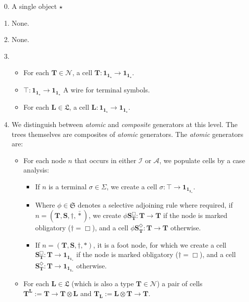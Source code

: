 \begin{myboxB}
\begin{multicols}{2}
\begin{construction}
\begin{enumerate}
\setcounter{enumi}{-1}
\item{A single object $\star$}
\item{None.}
\item{None.}
\item{
	\begin{itemize}
	\item{For each $\mathbf{T} \in \mathcal{N}$, a cell $\mathbf{T}: \mathbf{1}_{\mathbf{1}_\star} \rightarrow \mathbf{1}_{\mathbf{1}_\star}$.}
	\item{$\top: \mathbf{1}_{\mathbf{1}_\star} \rightarrow \mathbf{1}_{\mathbf{1}_\star}$ A wire for terminal symbols.}
	\item{For each $\mathbf{L} \in \mathfrak{L}$, a cell $\mathbf{L} : \mathbf{1}_{\mathbf{1}_\star} \rightarrow \mathbf{1}_{\mathbf{1}_\star}$.}
	\end{itemize}
}
\item{
	We distinguish between \emph{atomic} and \emph{composite} generators at this level. The trees themselves are composites of \emph{atomic} generators. The \emph{atomic} generators are:
	\begin{itemize}
	\item{For each node $n$ that occurs in either $\mathcal{I}$ or $\mathcal{A}$, we populate cells by a case analysis:
	\begin{itemize}
		\item{If $n$ is a terminal $\sigma \in \Sigma$, we create a cell $\sigma: \top \rightarrow \mathbf{1}_{\mathbf{1}_{\mathbf{1}_\star}}$.}
		\item{Where $\phi \in \mathfrak{S}$ denotes a selective adjoining rule where required, if $n = (\mathbf{T},\mathbf{S},\dagger,\bar{*})$, we create $\phi\mathbf{S}_\mathbf{T}^\Box: \mathbf{T} \rightarrow \mathbf{T}$ if the node is marked obligatory ($\dagger = \Box$), and a cell $\phi\mathbf{S}_\mathbf{T}^\Diamond: \mathbf{T} \rightarrow \mathbf{T}$ otherwise.}
		\item{If $n = (\mathbf{T},\mathbf{S},\dagger,*)$, it is a foot node, for which we create a cell $\mathbf{S}_\mathbf{T}^\Box: \mathbf{T} \rightarrow \mathbf{1}_{\mathbf{1}_{\mathbf{1}_\star}}$ if the node is marked obligatory ($\dagger = \Box$), and a cell $\mathbf{S}_\mathbf{T}^\Diamond: \mathbf{T} \rightarrow \mathbf{1}_{\mathbf{1}_{\mathbf{1}_\star}}$ otherwise.}
	\end{itemize}
	}
	\item{For each $\mathbf{L} \in \mathfrak{L}$ (which is also a type $\mathbf{T} \in \mathcal{N}$) a pair of cells $\mathbf{T}^\mathbf{L} := \mathbf{T} \rightarrow \mathbf{T} \otimes \mathbf{L}$ and $\mathbf{T}_\mathbf{L} := \mathbf{L} \otimes \mathbf{T} \rightarrow \mathbf{T}$.}

\end{itemize}}
\end{enumerate}
\end{construction}
\end{multicols}
\end{myboxB}
